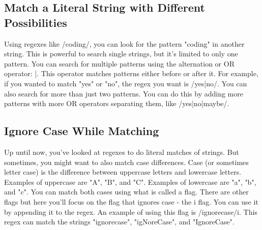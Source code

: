 \documentclass{article}%
\begin{document}
%
\subsection{Match a Literal String with Different Possibilities}%
\label{subsec:MatchaLiteralStringwithDifferentPossibilities}%
Using regexes like /coding/, you can look for the pattern "coding" in another string.\newline%
This is powerful to search single strings, but it's limited to only one pattern. You can search for multiple patterns using the alternation or OR operator: |.\newline%
This operator matches patterns either before or after it. For example, if you wanted to match "yes" or "no", the regex you want is /yes|no/.\newline%
You can also search for more than just two patterns. You can do this by adding more patterns with more OR operators separating them, like /yes|no|maybe/.\newline%

%
\subsection{Ignore Case While Matching}%
\label{subsec:IgnoreCaseWhileMatching}%
Up until now, you've looked at regexes to do literal matches of strings. But sometimes, you might want to also match case differences.\newline%
Case (or sometimes letter case) is the difference between uppercase letters and lowercase letters. Examples of uppercase are "A", "B", and "C". Examples of lowercase are "a", "b", and "c".\newline%
You can match both cases using what is called a flag. There are other flags but here you'll focus on the flag that ignores case {-} the i flag. You can use it by appending it to the regex.  An example of using this flag is /ignorecase/i. This regex can match the strings "ignorecase", "igNoreCase", and "IgnoreCase".\newline%

%
\end{document}
